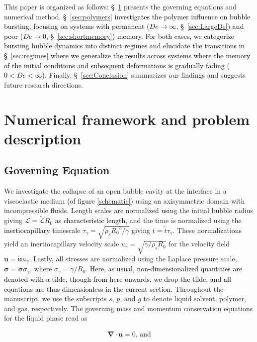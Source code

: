 \documentclass{jfm}
\newcommand{\DL}[1]{{\textcolor{black}{#1}}}
\newcommand{\VS}[1]{{\textcolor{black}{#1}}}
\newcommand{\AKD}[1]{{\textcolor{black}{#1}}}
\begin{document}
This paper is organized as follows: \S~\ref{sec:method} presents the governing equations and numerical method. \VS{\S~\ref{sec:polymers} investigates the polymer influence on bubble bursting, focusing on systems with permanent ($De \to \infty$, \S~\ref{sec:LargeDe}) and poor ($De \to 0$, \S~\ref{sec:shortmemory}) memory. For both cases, we categorize bursting bubble dynamics into distinct regimes and elucidate the transitions in \S~\ref{sec:regimes} where we generalize the results across systems where the memory of the initial conditions and subsequent deformations is gradually fading ($0 < De < \infty$).}
Finally, \S~\ref{sec:Conclusion} summarizes our findings and suggests future research directions.

\section{Numerical framework and problem description}
\label{sec:method}

\subsection {Governing Equation}
\label{subsec:governingEqn}

We investigate the collapse of an open bubble cavity at the interface in a viscoelastic medium \DL{(of figure \ref{schematic})} using an axisymmetric domain with incompressible fluids.
Length scales are normalized using the initial bubble radius giving $\mathcal{L} = \tilde{\mathcal{L}}R_0$ \DL{as characteristic length,} and the time is normalized using \DL{the} \AKD{inertiocapillary} timescale $\tau_\gamma = \sqrt{\rho_s {R_0}^3/\gamma}$ giving $t = \tilde{t}\tau_{\gamma}$. These normalizations yield an \AKD{inertiocapillary} velocity scale $u_{\gamma} = \sqrt{\gamma/ \rho_{s} R_0}$ for the velocity field $\boldsymbol{u} = \tilde{\boldsymbol{u}}u_\gamma$. Lastly, all stresses are normalized using the Laplace pressure scale, $\boldsymbol{\sigma} = \tilde{\boldsymbol{\sigma}}\sigma_\gamma$, where $\sigma_\gamma = \gamma/R_0$.
\DL{Here, as usual, non-dimensionalized quantities are denoted with a tilde, though from here onwards, we drop the tilde, and all equations are thus dimensionless in the current section.}
Throughout the manuscript, we use the subscripts $s$, $p$, and $g$ to denote liquid solvent, polymer, and gas, respectively.
The governing mass and momentum conservation equations for the liquid phase read as

\begin{align}
	\label{massconserve}
	\boldsymbol{\nabla\cdot u}=0,\,\text{and}
\end{align}
\end{document}

